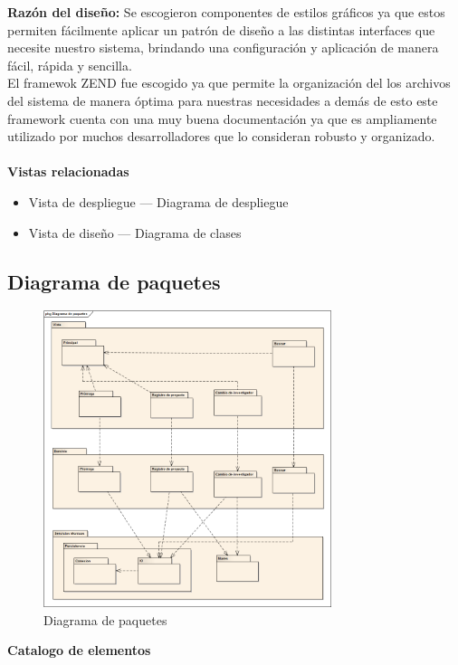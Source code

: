 \documentclass[12pt,oneside,letterpaper]{report}
\begin{document}
\textbf{Razón del diseño:}
Se escogieron componentes de estilos gráficos ya que estos permiten fácilmente aplicar un patrón de diseño a las distintas interfaces que necesite nuestro sistema, brindando una configuración y aplicación de manera fácil, rápida y sencilla.\\
El framewok ZEND fue escogido ya que permite la organización del los archivos del sistema de manera óptima para nuestras necesidades a demás de esto este framework cuenta con una muy buena documentación ya que es ampliamente utilizado por muchos desarrolladores que lo consideran robusto y organizado.\\
\\

\textbf{Vistas relacionadas}
\begin{itemize}
\item Vista de despliegue --- Diagrama de despliegue
\item Vista de diseño --- Diagrama de clases
\end{itemize}

\subsection{Diagrama de paquetes}

\begin{figure}[h!]
  \centering
    \includegraphics[width=0.75\textwidth]{./img/img10.png}
  \caption{Diagrama de paquetes}
\end{figure}


\textbf{Catalogo de elementos}\\
\end{document}
